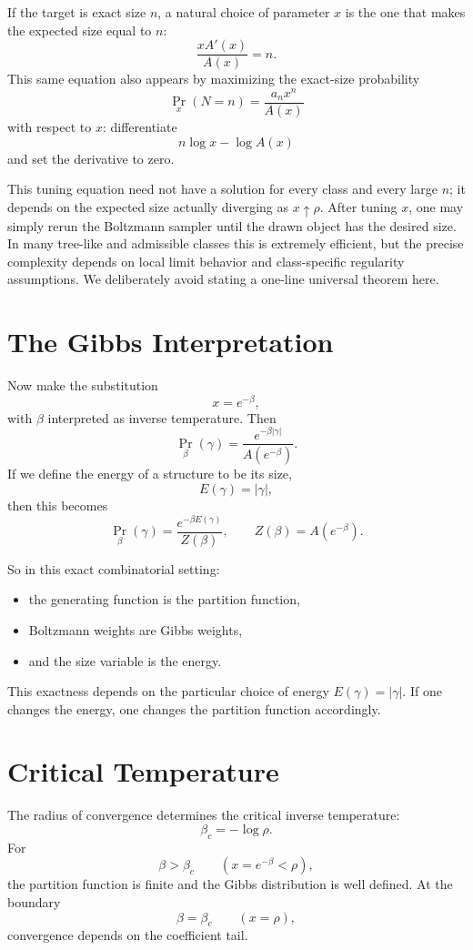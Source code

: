 If the target is exact size $n$, a natural choice of parameter $x$ is the one that makes the expected size equal to $n$:
\[
  \frac{xA'(x)}{A(x)} = n.
\]
This same equation also appears by maximizing the exact-size probability
\[
  \Pr_x(N=n)=\frac{a_n x^n}{A(x)}
\]
with respect to $x$: differentiate
\[
  n\log x - \log A(x)
\]
and set the derivative to zero.

This tuning equation need not have a solution for every class and every large $n$; it depends on the expected size actually diverging as $x \uparrow \rho$. After tuning $x$, one may simply rerun the Boltzmann sampler until the drawn object has the desired size. In many tree-like and admissible classes this is extremely efficient, but the precise complexity depends on local limit behavior and class-specific regularity assumptions. We deliberately avoid stating a one-line universal theorem here.

\section{The Gibbs Interpretation}

Now make the substitution
\[
  x=e^{-\beta},
\]
with $\beta$ interpreted as inverse temperature. Then
\[
  \Pr_\beta(\gamma) = \frac{e^{-\beta |\gamma|}}{A(e^{-\beta})}.
\]
If we define the energy of a structure to be its size,
\[
  E(\gamma)=|\gamma|,
\]
then this becomes
\[
  \Pr_\beta(\gamma)=\frac{e^{-\beta E(\gamma)}}{Z(\beta)},
  \qquad
  Z(\beta)=A(e^{-\beta}).
\]

So in this exact combinatorial setting:
\begin{itemize}
  \item the generating function is the partition function,
  \item Boltzmann weights are Gibbs weights,
  \item and the size variable is the energy.
\end{itemize}

This exactness depends on the particular choice of energy $E(\gamma)=|\gamma|$. If one changes the energy, one changes the partition function accordingly.

\section{Critical Temperature}

The radius of convergence determines the critical inverse temperature:
\[
  \beta_c = -\log \rho.
\]
For
\[
  \beta > \beta_c
  \qquad (x=e^{-\beta}<\rho),
\]
the partition function is finite and the Gibbs distribution is well defined. At the boundary
\[
  \beta = \beta_c
  \qquad (x=\rho),
\]
convergence depends on the coefficient tail.

